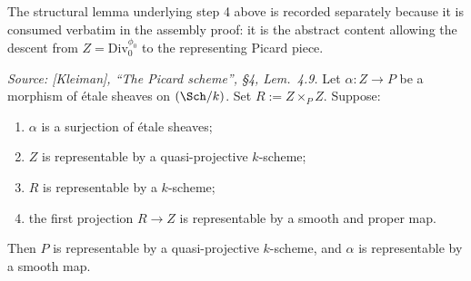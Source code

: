 The structural lemma underlying step 4 above is recorded separately
because it is consumed verbatim in the assembly proof: it is the
abstract content allowing the descent from \(Z = \mathrm{Div}^{\phi_0}_0\) to the
representing Picard piece.

\begin{lemma}
  \label{lem:smooth_proper_quotient}
  \textit{Source: [Kleiman], ``The Picard scheme'', \S 4, Lem.~4.9.}
  Let \(\alpha : Z \to P\) be a morphism of \'etale sheaves on \((\Sch/k)\).
  Set \(R := Z \times_P Z\). Suppose:
  \begin{enumerate}
    \item \(\alpha\) is a surjection of \'etale sheaves;
    \item \(Z\) is representable by a quasi-projective \(k\)-scheme;
    \item \(R\) is representable by a \(k\)-scheme;
    \item the first projection \(R \to Z\) is representable by a smooth
      and proper map.
  \end{enumerate}
  Then \(P\) is representable by a quasi-projective \(k\)-scheme, and \(\alpha\)
  is representable by a smooth map.
\end{lemma}

